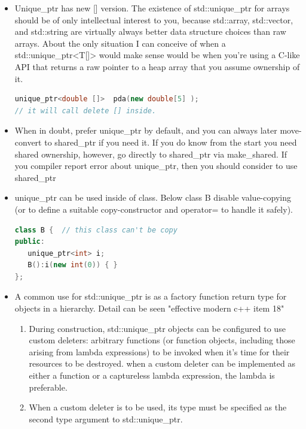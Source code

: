 \documentclass[a4paper,12pt,twoside]{book}
\begin{document}
\begin{itemize}
\item Unique\_ptr has new [] version. The existence of std::unique\_ptr for arrays should be of only intellectual interest to you, because std::array, std::vector, and std::string are virtually always better data structure choices than raw arrays. About the only situation I can conceive of when a std::unique\_ptr<T[]> would make sense would be when you're using a C-like API that returns a raw pointer to a heap array that you assume ownership of it.
\begin{lstlisting}[frame=single, language=c++]
unique_ptr<double []>  pda(new double[5] );
// it will call delete [] inside.
\end{lstlisting}

\item When in doubt, prefer unique\_ptr by default, and you can always later move-convert to shared\_ptr if you need it. If you do know from the start you need shared ownership, however, go directly to shared\_ptr via make\_shared. If you compiler report error about unique\_ptr, then you should consider to use shared\_ptr

\item unique\_ptr can be used inside of class. Below class B disable value-copying (or to define a suitable copy-constructor  and operator= to handle it safely).
\begin{lstlisting}[frame=single, language=c++]
class B {  // this class can't be copy
public:
   unique_ptr<int> i;
   B():i(new int(0)) { }
};
\end{lstlisting}
\item A common use for std::unique\_ptr is as a factory function return type for objects
in a hierarchy. Detail can be seen "effective modern c++ item 18"

\begin{enumerate}
\item During construction, std::unique\_ptr objects can be configured to use custom deleters: arbitrary functions (or function objects, including those arising from lambda expressions) to be invoked when it's time for their resources to be destroyed. when a custom deleter can be implemented as either a function or a captureless lambda expression, the lambda is preferable.

\item When a custom deleter is to be used, its type must be specified as the second type argument to std::unique\_ptr.
\end{enumerate}


\end{itemize}
\end{document}
